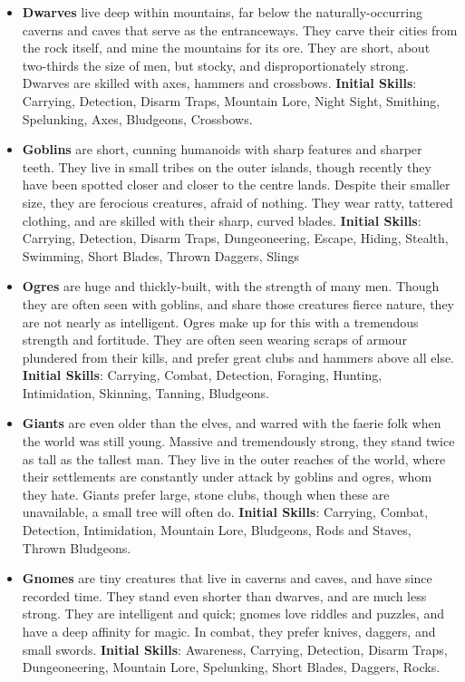 \begin{itemize}
\item {\bf Dwarves} live deep within mountains, far below the 
naturally-occurring caverns and caves that serve as the entranceways.  They
carve their cities from the rock itself, and mine the mountains for its 
ore.  They are short, about two-thirds the size of men, but stocky, and 
disproportionately strong.  Dwarves are skilled with axes, hammers and 
crossbows. \textbf{Initial Skills}: Carrying, Detection, Disarm Traps,
Mountain Lore, Night Sight, Smithing, Spelunking, Axes, Bludgeons,
Crossbows.

\item {\bf Goblins} are short, cunning humanoids with sharp features and 
sharper teeth.  They live in small tribes on the outer islands, though 
recently they have been spotted closer and closer to the centre lands.   
Despite their smaller size, they are ferocious creatures, afraid of 
nothing.  They wear ratty, tattered clothing, and are skilled with their 
sharp, curved blades. \textbf{Initial Skills}: Carrying, Detection,
Disarm Traps, Dungeoneering, Escape, Hiding, Stealth, Swimming, Short
Blades, Thrown Daggers, Slings

\item {\bf Ogres} are huge and thickly-built, with the strength of many 
men.  Though they are often seen with goblins, and share those creatures 
fierce nature, they are not nearly as intelligent.  Ogres make up for this 
with a tremendous strength and fortitude.  They are often seen wearing 
scraps of armour plundered from their kills, and prefer great clubs and 
hammers above all else. \textbf{Initial Skills}: Carrying, Combat,
Detection, Foraging, Hunting, Intimidation, Skinning, Tanning, Bludgeons.

\item {\bf Giants} are even older than the elves, and warred with the 
faerie folk when the world was still young.  Massive and tremendously 
strong, they stand twice as tall as the tallest man.  They live in the 
outer reaches of the world, where their settlements are constantly under 
attack by goblins and ogres, whom they hate. Giants prefer large, stone 
clubs, though when these are unavailable, a small tree will often do.
\textbf{Initial Skills}: Carrying, Combat, Detection, Intimidation,
Mountain Lore, Bludgeons, Rods and Staves, Thrown Bludgeons.

\item {\bf Gnomes} are tiny creatures that live in caverns and caves, and 
have since recorded time.  They stand even shorter than dwarves, and are 
much less strong.  They are intelligent and quick; gnomes love riddles and 
puzzles, and have a deep affinity for magic.  In combat, they prefer knives,
daggers, and small swords. \textbf{Initial Skills}: Awareness, Carrying,
Detection, Disarm Traps, Dungeoneering, Mountain Lore, Spelunking, Short
Blades, Daggers, Rocks.
\end{itemize}

